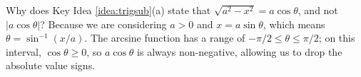 {Why does Key Idea \ref{idea:trigsub}(a) state that $\sqrt{a^2-x^2} = a\cos\theta$, and not $|a\cos\theta|$?
}
{Because we are considering $a>0$ and $x=a\sin \theta$, which means $\theta = \sin^{-1}(x/a)$. The arcsine function has a range of $-\pi/2\leq \theta \leq \pi/2$; on this interval, $\cos \theta \geq 0$, so $a\cos\theta$ is always non-negative, allowing us to drop the absolute value signs.
}
